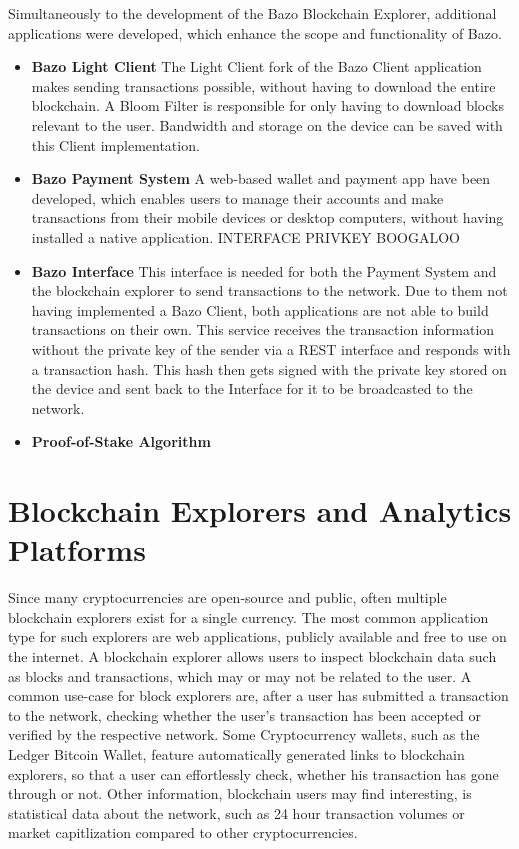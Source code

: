 Simultaneously to the development of the Bazo Blockchain Explorer, additional applications were developed, which enhance the scope and functionality of Bazo. 

\begin{itemize}
\item \textbf{Bazo Light Client}
The Light Client fork of the Bazo Client application makes sending transactions possible, without having to download the entire blockchain. A Bloom Filter is responsible for only having to download blocks relevant to the user. Bandwidth and storage on the device can be saved with this Client implementation.
\item \textbf{Bazo Payment System}
A web-based wallet and payment app have been developed, which enables users to manage their accounts and make transactions from their mobile devices or desktop computers, without having installed a native application. INTERFACE PRIVKEY BOOGALOO
\item \textbf{Bazo Interface}
This interface is needed for both the Payment System and the blockchain explorer to send transactions to the network. Due to them not having implemented a Bazo Client, both applications are not able to build transactions on their own. This service receives the transaction information without the private key of the sender via a REST interface and responds with a transaction hash. This hash then gets signed with the private key stored on the device and sent back to the Interface for it to be broadcasted to the network.
\item \textbf{Proof-of-Stake Algorithm}
\end{itemize}

\section{Blockchain Explorers and Analytics Platforms}
Since many cryptocurrencies are open-source and public, often multiple blockchain explorers exist for a single currency. The most common application type for such explorers are web applications, publicly available and free to use on the internet. A blockchain explorer allows users to inspect blockchain data such as blocks and transactions, which may or may not be related to the user. A common use-case for block explorers are, after a user has submitted a transaction to the network, checking whether the user's transaction has been accepted or verified by the respective network. Some Cryptocurrency wallets, such as the Ledger Bitcoin Wallet, feature automatically generated links to blockchain explorers, so that a user can effortlessly check, whether his transaction has gone through or not. Other information, blockchain users may find interesting, is statistical data about the network, such as 24 hour transaction volumes or market capitlization compared to other cryptocurrencies. 


